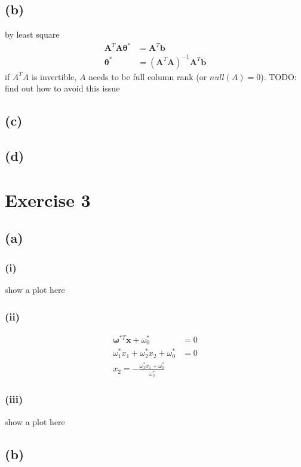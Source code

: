 \documentclass[11pt]{article}
\begin{document}
\subsection*{(b)}
by least square
\begin{equation}	\label{eq2(b)}
\begin{split}
\pmb{A}^T\pmb{A\theta}^*&=\pmb{A}^T\pmb{b}\\
\pmb{\theta}^*&=(\pmb{A}^T\pmb{A})^{-1}\pmb{A}^T\pmb{b}
\end{split}
\end{equation}
if $A^TA$ is invertible, $A$ needs to be full column rank (or $null(A)=0$).
TODO: find out how to avoid this issue

\subsection*{(c)}

\subsection*{(d)}

\section*{Exercise 3}

\subsection*{(a)}
\subsubsection*{(i)}
show a plot here
\subsubsection*{(ii)}

\begin{equation}
\begin{split}
\pmb{\omega}^{*T}\pmb{x}+\omega_0^*&=0\\
\omega_1^*x_1+\omega_2^*x_2+\omega_0^*&=0\\
x_2=-\frac{\omega_1^*x_1+\omega_0^*}{\omega_2^*}
\end{split}
\end{equation}
\subsubsection*{(iii)}
show a plot here
\subsection*{(b)}
\end{document}
